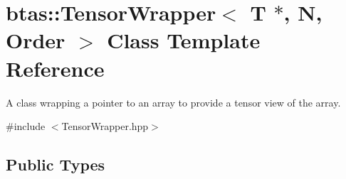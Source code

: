 \hypertarget{classbtas_1_1_tensor_wrapper_3_01_t_01_5_00_01_n_00_01_order_01_4}{
\section{btas::TensorWrapper$<$ T $\ast$, N, Order $>$ Class Template Reference}
\label{classbtas_1_1_tensor_wrapper_3_01_t_01_5_00_01_n_00_01_order_01_4}
}


A class wrapping a pointer to an array to provide a tensor view of the array.  


{\ttfamily \#include $<$TensorWrapper.hpp$>$}\subsection*{Public Types}
